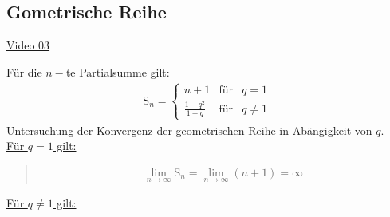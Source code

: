 \subsection{Gometrische Reihe}
\href{https://youtu.be/nmtUHgdMWXs}{Video 03}\\
\begin{center}
\end{center}
Für die $ n- $te Partialsumme gilt:\\
\begin{align*}
\mathrm{S}_n =   \left\{ \begin{array}{rcl}
n+1 & \mbox{für} & q=1\\
\frac{1-q^2}{1-q}&\mbox{für}& q\neq1
\end{array}\right.
\end{align*}
Untersuchung der Konvergenz der geometrischen Reihe in Abängigkeit von $ q $.\\
\underline{Für $ q=1 $ gilt:}\\
\begin{quote}
	\begin{align*}
	\lim\limits_ {n\to\infty}\mathrm{S}_n=\lim\limits_ {n\to\infty}(n+1)=\infty
	\end{align*}
\end{quote}
\newpage
\noindent
\underline{Für $ q\neq 1 $ gilt:}\\
